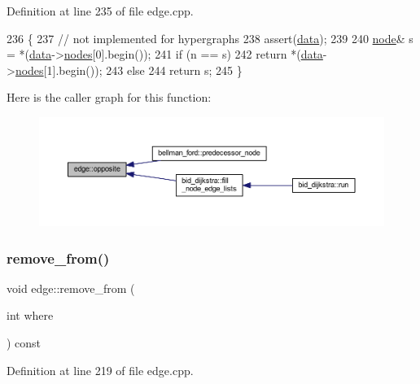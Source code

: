 Definition at line 235 of file edge.\+cpp.


\begin{DoxyCode}
236 \{
237     \textcolor{comment}{// not implemented for hypergraphs}
238     assert(\mbox{\hyperlink{classedge_a0ebb6dfa28b77f47529085049352b436}{data}});
239 
240     \mbox{\hyperlink{classnode}{node}}& s = *(\mbox{\hyperlink{classedge_a0ebb6dfa28b77f47529085049352b436}{data}}->\mbox{\hyperlink{classedge__data_a870bbbb05de6c5f63d434db624c55dd4}{nodes}}[0].begin());
241     \textcolor{keywordflow}{if} (n == s)
242     \textcolor{keywordflow}{return} *(\mbox{\hyperlink{classedge_a0ebb6dfa28b77f47529085049352b436}{data}}->\mbox{\hyperlink{classedge__data_a870bbbb05de6c5f63d434db624c55dd4}{nodes}}[1].begin());
243     \textcolor{keywordflow}{else}
244     \textcolor{keywordflow}{return} s;
245 \}
\end{DoxyCode}
Here is the caller graph for this function\+:\nopagebreak
\begin{figure}[H]
\begin{center}
\leavevmode
\includegraphics[width=350pt]{classedge_ab64dc3659c9003337b0c3749a8b879cf_icgraph}
\end{center}
\end{figure}
\mbox{\label{classedge_abcd4eeaf23327d026beac9ee1d0fa7e9}} 
\subsubsection{\texorpdfstring{remove\+\_\+from()}{remove\_from()}}
{\footnotesize\ttfamily void edge\+::remove\+\_\+from (\begin{DoxyParamCaption}\item[{int}]{where }\end{DoxyParamCaption}) const\hspace{0.3cm}{\ttfamily [private]}}



Definition at line 219 of file edge.\+cpp.


